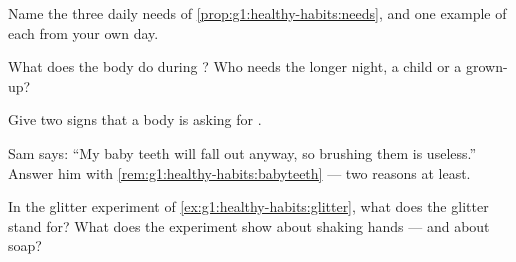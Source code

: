 \begin{exercise}[$\star$]\label{exo:g1:healthy-habits:6}
Name the three daily needs of \cref{prop:g1:healthy-habits:needs},
and one example of each from your own day.
\end{exercise}

\begin{exercise}[$\star$]\label{exo:g1:healthy-habits:7}
What does the body do during ? Who needs the longer night, a
child or a grown-up?
\end{exercise}

\begin{exercise}[$\star$]\label{exo:g1:healthy-habits:8}
Give two signs that a body is asking for .
\end{exercise}

\begin{exercise}[$\star\star$]\label{exo:g1:healthy-habits:9}
Sam says: ``My baby teeth will fall out anyway, so brushing them
is useless.'' Answer him with
\cref{rem:g1:healthy-habits:babyteeth} --- two reasons at least.
\end{exercise}

\begin{exercise}[$\star\star$]\label{exo:g1:healthy-habits:10}
In the glitter experiment of \cref{ex:g1:healthy-habits:glitter},
what does the glitter stand for? What does the experiment show
about shaking hands --- and about soap?
\end{exercise}

